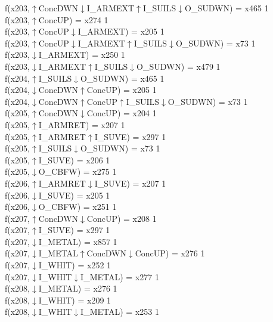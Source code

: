 f(x203,$\uparrow$ConcDWN$\downarrow$I\_ARMEXT$\uparrow$I\_SUILS$\downarrow$O\_SUDWN) = x465 {1} \\
f(x203,$\uparrow$ConcUP) = x274 {1} \\
f(x203,$\uparrow$ConcUP$\downarrow$I\_ARMEXT) = x205 {1} \\
f(x203,$\uparrow$ConcUP$\downarrow$I\_ARMEXT$\uparrow$I\_SUILS$\downarrow$O\_SUDWN) = x73 {1} \\
f(x203,$\downarrow$I\_ARMEXT) = x250 {1} \\
f(x203,$\downarrow$I\_ARMEXT$\uparrow$I\_SUILS$\downarrow$O\_SUDWN) = x479 {1} \\
f(x204,$\uparrow$I\_SUILS$\downarrow$O\_SUDWN) = x465 {1} \\
f(x204,$\downarrow$ConcDWN$\uparrow$ConcUP) = x205 {1} \\
f(x204,$\downarrow$ConcDWN$\uparrow$ConcUP$\uparrow$I\_SUILS$\downarrow$O\_SUDWN) = x73 {1} \\
f(x205,$\uparrow$ConcDWN$\downarrow$ConcUP) = x204 {1} \\
f(x205,$\uparrow$I\_ARMRET) = x207 {1} \\
f(x205,$\uparrow$I\_ARMRET$\uparrow$I\_SUVE) = x297 {1} \\
f(x205,$\uparrow$I\_SUILS$\downarrow$O\_SUDWN) = x73 {1} \\
f(x205,$\uparrow$I\_SUVE) = x206 {1} \\
f(x205,$\downarrow$O\_CBFW) = x275 {1} \\
f(x206,$\uparrow$I\_ARMRET$\downarrow$I\_SUVE) = x207 {1} \\
f(x206,$\downarrow$I\_SUVE) = x205 {1} \\
f(x206,$\downarrow$O\_CBFW) = x251 {1} \\
f(x207,$\uparrow$ConcDWN$\downarrow$ConcUP) = x208 {1} \\
f(x207,$\uparrow$I\_SUVE) = x297 {1} \\
f(x207,$\downarrow$I\_METAL) = x857 {1} \\
f(x207,$\downarrow$I\_METAL$\uparrow$ConcDWN$\downarrow$ConcUP) = x276 {1} \\
f(x207,$\downarrow$I\_WHIT) = x252 {1} \\
f(x207,$\downarrow$I\_WHIT$\downarrow$I\_METAL) = x277 {1} \\
f(x208,$\downarrow$I\_METAL) = x276 {1} \\
f(x208,$\downarrow$I\_WHIT) = x209 {1} \\
f(x208,$\downarrow$I\_WHIT$\downarrow$I\_METAL) = x253 {1} \\
